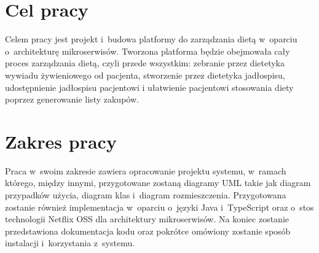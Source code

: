 \section*{Cel pracy}\label{sec:thesis-goal}

Celem pracy jest projekt i~budowa platformy do zarządzania dietą w~oparciu o~architekturę mikroserwisów.
Tworzona platforma będzie obejmowała cały proces zarządzania dietą, czyli przede wszystkim:
zebranie przez dietetyka wywiadu żywieniowego od pacjenta,
stworzenie przez dietetyka jadłospisu,
udostępnienie jadłospisu pacjentowi
i ułatwienie pacjentowi stosowania diety poprzez generowanie listy zakupów.

\section*{Zakres pracy}\label{sec:scope-of-work}

Praca w~swoim zakresie zawiera opracowanie projektu systemu, w~ramach którego, między innymi,
przygotowane zostaną diagramy UML takie jak diagram przypadków użycia, diagram klas i~diagram rozmieszczenia.
Przygotowana zostanie również implementacja w~oparciu o~języki Java i~TypeScript oraz o~stos technologii Netflix OSS dla architektury mikroserwisów.
Na koniec zostanie przedstawiona dokumentacja kodu oraz pokrótce omówiony zostanie sposób instalacji i~korzystania z~systemu.

\thispagestyle{normal}

